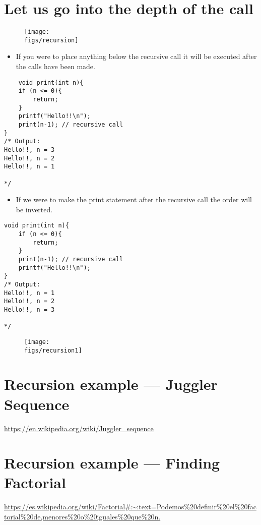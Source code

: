 \section{Let us go into the depth of the call}
\begin{figure}[H]
    \centering
    \texttt{[image: \\figs/recursion]} 
\end{figure}
\begin{itemize}
    \item If you were to place anything below the recursive call it will be executed after the calls have been made.
\end{itemize}
\begin{verbatim}
    void print(int n){
    if (n <= 0){
        return; 
    }
    printf("Hello!!\n");
    print(n-1); // recursive call
}
/* Output: 
Hello!!, n = 3
Hello!!, n = 2
Hello!!, n = 1

*/
\end{verbatim}
\begin{itemize}
    \item If we were to make the print statement after the recursive call the order will be inverted. 
\end{itemize}
\begin{verbatim}
void print(int n){
    if (n <= 0){
        return; 
    }
    print(n-1); // recursive call
    printf("Hello!!\n");
}
/* Output: 
Hello!!, n = 1
Hello!!, n = 2
Hello!!, n = 3

*/
\end{verbatim}
\begin{figure}[H]
    \centering
    \texttt{[image: \\figs/recursion1]} 
\end{figure}

\section{Recursion example — Juggler Sequence}
\url{https://en.wikipedia.org/wiki/Juggler_sequence}

\section{Recursion example — Finding Factorial}
\url{https://es.wikipedia.org/wiki/Factorial#:~:text=Podemos%20definir%20el%20factorial%20de,menores%20o%20iguales%20que%20n.}


